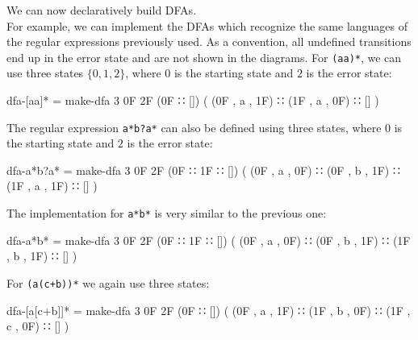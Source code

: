 We can now declaratively build DFAs.\\
For example, we can implement the DFAs which recognize the same languages of the regular expressions previously used. As a convention, all undefined transitions end up in the error state and are not shown in the diagrams. For \texttt{(aa)*}, we can use three states $\{0, 1, 2\}$, where $0$ is the starting state and $2$ is the error state:

\begin{agda}
dfa-[aa]* = make-dfa 3 0F 2F (0F ∷ []) (
        (0F , a , 1F)
      ∷ (1F , a , 0F)
      ∷ []
    )
\end{agda}
The regular expression \texttt{a*b?a*} can also be defined using three states, where $0$ is the starting state and $2$ is the error state:

\begin{agda}
dfa-a*b?a* = make-dfa 3 0F 2F (0F ∷ 1F ∷ []) (
        (0F , a , 0F)
      ∷ (0F , b , 1F)
      ∷ (1F , a , 1F)
      ∷ []
    )
\end{agda}
The implementation for \texttt{a*b*} is very similar to the previous one:

\begin{agda}
dfa-a*b* = make-dfa 3 0F 2F (0F ∷ 1F ∷ []) (
        (0F , a , 0F)
      ∷ (0F , b , 1F)
      ∷ (1F , b , 1F)
      ∷ []
    )
\end{agda}
For \texttt{(a(c+b))*} we again use three states:

\begin{agda}
dfa-[a[c+b]]* = make-dfa 3 0F 2F (0F ∷ []) (
        (0F , a , 1F)
      ∷ (1F , b , 0F)
      ∷ (1F , c , 0F)
      ∷ []
    )
\end{agda}
